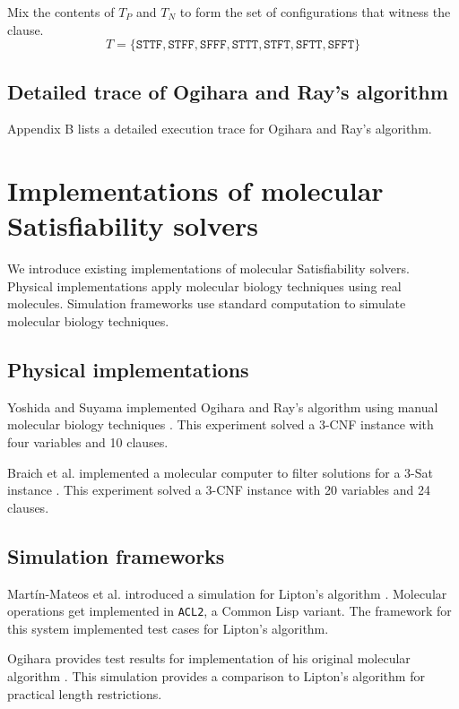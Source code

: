 \noindent Mix the contents of $T_P$ and $T_N$ to form the set of configurations that witness the clause. 
\[
T = \{ \texttt{STTF}, \texttt{STFF}, \texttt{SFFF},  \texttt{STTT}, \texttt{STFT}, \texttt{SFTT}, \texttt{SFFT}\}
\]
		
	\subsection{Detailed trace of Ogihara and Ray's algorithm}
	
Appendix B lists a detailed execution trace for Ogihara and Ray's algorithm.

\section{Implementations of molecular {\sc Satisfiability} solvers}

We introduce existing implementations of molecular {\sc Satisfiability} solvers.  Physical implementations apply molecular biology techniques using real molecules.  Simulation frameworks use standard computation to simulate molecular biology techniques.

	\subsection{Physical implementations}
	

Yoshida and Suyama implemented Ogihara and Ray's algorithm using manual molecular biology techniques \cite{dnaBasedImplemetation_Yoshida2000}.  This experiment solved a 3-CNF instance with four variables and 10 clauses.

Braich et al. implemented a molecular computer to filter solutions for a 3-{\sc Sat} instance \cite{Braich02solutionof}.  This experiment solved a 3-CNF instance with 20 variables and 24 clauses.
	
	\subsection{Simulation frameworks}

Martín-Mateos et al. introduced a simulation for Lipton's algorithm \cite{MartinMateos02molecularcomputation}.   Molecular operations get implemented in \texttt{ACL2}, a Common Lisp variant.  The framework for this system implemented test cases for Lipton's algorithm.

Ogihara provides test results for implementation of his original molecular algorithm \cite{Ogihara:1996:BFS:898228}.  This simulation provides a comparison to Lipton's algorithm for practical length restrictions.
